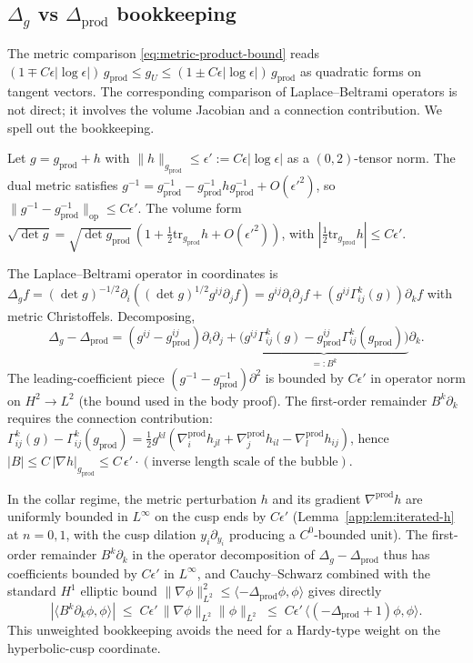 \documentclass[11pt,letterpaper]{article}
\theoremstyle{definition}
\newcommand{\Lap}{\Delta}
\begin{document}
\subsection{$\Lap_g$ vs $\Lap_{\mathrm{prod}}$ bookkeeping}\label{app:sec:laplacian}

The metric comparison \eqref{eq:metric-product-bound} reads $(1\mp C\epsilon|\log\epsilon|)\,g_{\mathrm{prod}} \le g_U \le (1\pm C\epsilon|\log\epsilon|)\,g_{\mathrm{prod}}$ as quadratic forms on tangent vectors. The corresponding comparison of Laplace--Beltrami operators is not direct; it involves the volume Jacobian and a connection contribution. We spell out the bookkeeping.

Let $g = g_{\mathrm{prod}} + h$ with $\|h\|_{g_{\mathrm{prod}}} \le \epsilon' := C\epsilon|\log\epsilon|$ as a $(0,2)$-tensor norm. The dual metric satisfies $g^{-1} = g_{\mathrm{prod}}^{-1} - g_{\mathrm{prod}}^{-1} h g_{\mathrm{prod}}^{-1} + O({\epsilon'}^2)$, so $\|g^{-1} - g_{\mathrm{prod}}^{-1}\|_{\mathrm{op}} \le C\epsilon'$. The volume form $\sqrt{\det g} = \sqrt{\det g_{\mathrm{prod}}}\,(1 + \tfrac12 \mathrm{tr}_{g_{\mathrm{prod}}}h + O({\epsilon'}^2))$, with $|\tfrac12\mathrm{tr}_{g_{\mathrm{prod}}}h| \le C \epsilon'$.

The Laplace--Beltrami operator in coordinates is $\Lap_g f = (\det g)^{-1/2}\partial_i((\det g)^{1/2}g^{ij}\partial_j f) = g^{ij}\partial_i\partial_j f + (g^{ij}\Gamma_{ij}^k(g))\partial_k f$ with metric Christoffels. Decomposing,
\[
\Lap_g - \Lap_{\mathrm{prod}} = (g^{ij} - g_{\mathrm{prod}}^{ij})\partial_i\partial_j + \underbrace{\bigl(g^{ij}\Gamma^k_{ij}(g) - g_{\mathrm{prod}}^{ij}\Gamma^k_{ij}(g_{\mathrm{prod}})\bigr)}_{=: B^k}\partial_k.
\]
The leading-coefficient piece $(g^{-1} - g_{\mathrm{prod}}^{-1})\partial^2$ is bounded by $C\epsilon'$ in operator norm on $H^2 \to L^2$ (the bound used in the body proof). The first-order remainder $B^k\partial_k$ requires the connection contribution: $\Gamma^k_{ij}(g) - \Gamma^k_{ij}(g_{\mathrm{prod}}) = \tfrac12 g^{kl}(\nabla^{\mathrm{prod}}_i h_{jl} + \nabla^{\mathrm{prod}}_j h_{il} - \nabla^{\mathrm{prod}}_l h_{ij})$, hence $|B| \le C\,|\nabla h|_{g_{\mathrm{prod}}} \le C\,\epsilon'\cdot (\text{inverse length scale of the bubble})$.

In the collar regime, the metric perturbation $h$ and its gradient $\nabla^{\mathrm{prod}} h$ are uniformly bounded in $L^\infty$ on the cusp ends by $C\epsilon'$ (Lemma~\ref{app:lem:iterated-h} at $n=0, 1$, with the cusp dilation $y_i\partial_{y_i}$ producing a $C^0$-bounded unit). The first-order remainder $B^k\partial_k$ in the operator decomposition of $\Lap_g - \Lap_{\mathrm{prod}}$ thus has coefficients bounded by $C\epsilon'$ in $L^\infty$, and Cauchy--Schwarz combined with the standard $H^1$ elliptic bound $\|\nabla\phi\|_{L^2}^2 \le \langle -\Lap_{\mathrm{prod}}\phi,\phi\rangle$ gives directly
\[
|\langle B^k\partial_k\phi,\phi\rangle| \;\le\; C\epsilon'\,\|\nabla\phi\|_{L^2}\|\phi\|_{L^2} \;\le\; C\epsilon'\,\langle (-\Lap_{\mathrm{prod}}+1)\phi,\phi\rangle.
\]
This unweighted bookkeeping avoids the need for a Hardy-type weight on the hyperbolic-cusp coordinate.
\end{document}
